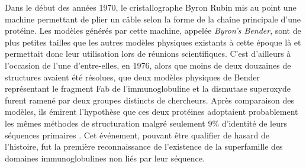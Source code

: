Dans le début des années 1970, le cristallographe Byron Rubin mis au point une machine permettant de plier un câble selon la forme de la chaîne principale d'une protéine. Les modèles générés par cette machine, appelée \textit{Byron's Bender}, sont de plus petites tailles que les autres modèles physiques existants à cette époque là et permettait donc leur utilisation lors de réunions scientifiques. C'est d'ailleurs à l'occasion de l'une d'entre-elles, en 1976, alors que moins de deux douzaines de structures avaient été résolues, que deux modèles physiques de Bender représentant le fragment Fab de l'immunoglobuline et la dismutase superoxyde furent ramené par deux groupes distincts de chercheurs. Après comparaison des modèles, ils émirent l'hypothèse que ces deux protéines adoptaient probablement les mêmes méthodes de structuration malgré seulement 9\% d'identité de leurs séquences primaires \cite{richardson1976similarity}. Cet événement, pouvant être qualifier de hasard de l'histoire, fut la première reconnaissance de l'existence de la superfamille des domaines immunoglobulines non liés par leur séquence.

